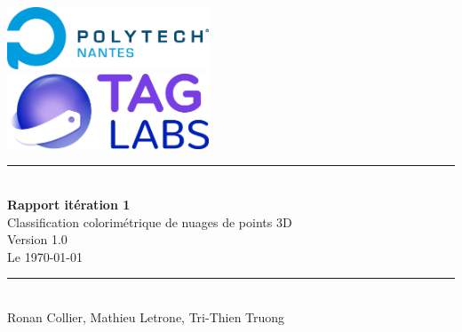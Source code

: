 \documentclass[12pt,titlepage,french]{article}
\begin{document}

\begin{titlepage}
\newcommand{\HRule}{\rule{\linewidth}{0.5mm}}
\center

  \includegraphics[width=0.45\textwidth]{../../ressources/img_logos/logo_polytech.png}\\[1cm]
   
  \includegraphics[width=0.45\textwidth]{../../ressources/img_logos/logo_taglabs.png}


\HRule \\[0.4cm]
{ \huge \bfseries Rapport itération 1\\[0.15cm] }
Classification colorimétrique de nuages de points 3D\\
Version 1.0\\
Le \today \\
\HRule \\[1.5cm]
Ronan Collier,
Mathieu Letrone,
Tri-Thien Truong
\\[1cm]
\end{titlepage}

\tableofcontents %
\newpage
\end{document}
